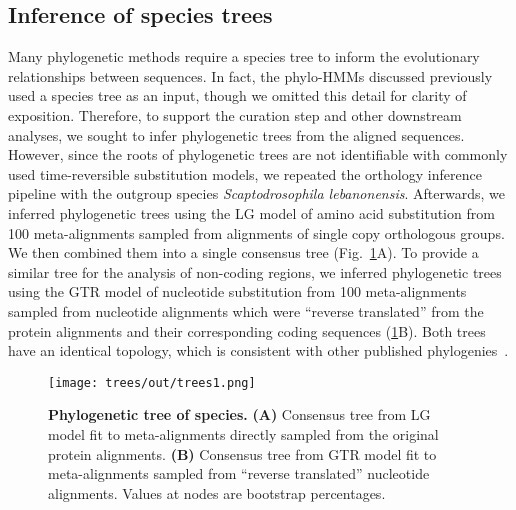 \subsection*{Inference of species trees}
Many phylogenetic methods require a species tree to inform the evolutionary relationships between sequences. In fact, the phylo-HMMs discussed previously used a species tree as an input, though we omitted this detail for clarity of exposition. Therefore, to support the curation step and other downstream analyses, we sought to infer phylogenetic trees from the aligned sequences. However, since the roots of phylogenetic trees are not identifiable with commonly used time-reversible substitution models, we repeated the orthology inference pipeline with the outgroup species \textit{Scaptodrosophila lebanonensis}. Afterwards, we inferred phylogenetic trees using the LG model of amino acid substitution from 100 meta-alignments sampled from alignments of single copy orthologous groups. We then combined them into a single consensus tree (Fig.~\ref{fig:trees}A). To provide a similar tree for the analysis of non-coding regions, we inferred phylogenetic trees using the GTR model of nucleotide substitution from 100 meta-alignments sampled from nucleotide alignments which were ``reverse translated'' from the protein alignments and their corresponding coding sequences (\ref{fig:trees}B). Both trees have an identical topology, which is consistent with other published phylogenies~\cite{D12GC2007, DaLage2007}.

\begin{figure}[h!]
\texttt{[image: trees/out/trees1.png]}
\centering
\caption{\textbf{Phylogenetic tree of species.}
\textbf{(A)} Consensus tree from LG model fit to meta-alignments directly sampled from the original protein alignments. \textbf{(B)} Consensus tree from GTR model fit to meta-alignments sampled from ``reverse translated'' nucleotide alignments. Values at nodes are bootstrap percentages.}
\label{fig:trees}
\end{figure}

